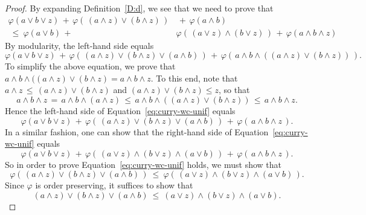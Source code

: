 \documentclass[main.tex]{subfiles}
\begin{document}
\begin{proof}
By expanding Definition~\ref{D:d},
we see that 
we need to prove that
\begin{equation}
\label{eq:curry-wc-unif}
\begin{split}
\varphi(a\vee b\vee z) \,+\,
\varphi(\,(a\wedge z)\vee(b\wedge z)\,) & \,+\,
\varphi(a\wedge b) \\
\ \leq\ 
\varphi(a \vee b)  \,+\, &
\varphi(\,(a\vee z)\wedge(b\vee z)\,) \,+\,
\varphi(a\wedge b \wedge z)
\end{split}
\end{equation}
By modularity,
the left-hand side equals
\begin{equation*}
\varphi(a\vee b \vee z) \,+\,
\varphi(\, (a\wedge z) \vee (b\wedge z) \vee (a\wedge b)\,) \,+\,
\varphi(\,a\wedge b\wedge ( (a \wedge z) \vee (b\wedge z) )\,).
\end{equation*}
To simplify the above equation,
we prove that
$a\wedge b\wedge ( (a \wedge z) \vee (b\wedge z)=a\wedge b\wedge z$.
To this end, note that
$a\wedge z \,\leq\, (a\wedge z)\vee (b\wedge z)$
and
$(a\wedge z)\vee(b\wedge z) \leq z$,
so that 
\begin{equation*}
a\wedge b\wedge z
\, =\, a\wedge b \wedge (a\wedge z)
\,\leq\, a\wedge b \wedge ((a\wedge z)\vee (b\wedge z))
\,\leq\, a\wedge b \wedge z.
\end{equation*}
Hence the left-hand side of Equation~\eqref{eq:curry-wc-unif}
equals
\begin{equation*}
\varphi(a\vee b \vee z) \,+\,
\varphi(\, (a\wedge z) \vee (b\wedge z) \vee (a\wedge b)\,) \,+\,
\varphi(\,a\wedge b\wedge z\,).
\end{equation*}
In a similar fashion,
one can show that the right-hand side of Equation~\eqref{eq:curry-wc-unif}
equals
\begin{equation*}
\varphi(a\vee b \vee z) \,+\,
\varphi(\, (a\vee z) \wedge (b\vee z) \wedge (a\vee b)\,) \,+\,
\varphi(\,a\wedge b\wedge z\,).
\end{equation*}
So in order to prove Equation~\eqref{eq:curry-wc-unif} holds,
we must show that
\begin{equation*}
\varphi(\, (a\wedge z) \vee (b\wedge z) \vee (a\wedge b)\,) 
\ \leq\ 
\varphi(\, (a\vee z) \wedge (b\vee z) \wedge (a\vee b)\,).
\end{equation*}
Since $\varphi$ is order preserving,
it suffices to show that 
\begin{equation*}
 (a\wedge z) \vee (b\wedge z) \vee (a\wedge b)
\ \leq\ 
  (a\vee z) \wedge (b\vee z) \wedge (a\vee b).

\end{equation*}
\end{proof}
\end{document}
